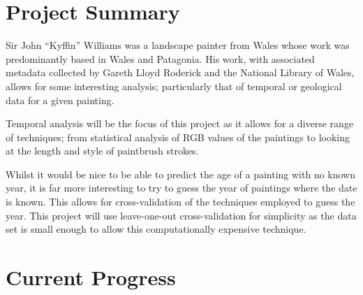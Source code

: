 \documentclass[11pt,fleqn,twoside]{article}
\begin{document}

\mmp

\setcounter{tocdepth}{3} %
\tableofcontents
\listoffigures
\listoftables

\newpage

\section{Project Summary}
Sir John ``Kyffin'' Williams was a landscape painter from Wales whose work was predominantly based 
in Wales and Patagonia. His work, with associated metadata collected by Gareth Lloyd Roderick and 
the National Library of Wales, allows for some interesting analysis; particularly that of temporal 
or geological data for a given painting.

Temporal analysis will be the focus of this project as it allows for a diverse range of techniques;
from statistical analysis of RGB values of the paintings to looking at the length and style of 
paintbrush strokes. 

Whilst it would be nice to be able to predict the age of a painting with no known year, it is far
more interesting to try to guess the year of paintings where the date is known. This allows for
cross-validation of the techniques employed to guess the year. This project will use leave-one-out
cross-validation for simplicity as the data set is small enough to allow this computationally 
expensive technique.

\section{Current Progress}
\end{document}
